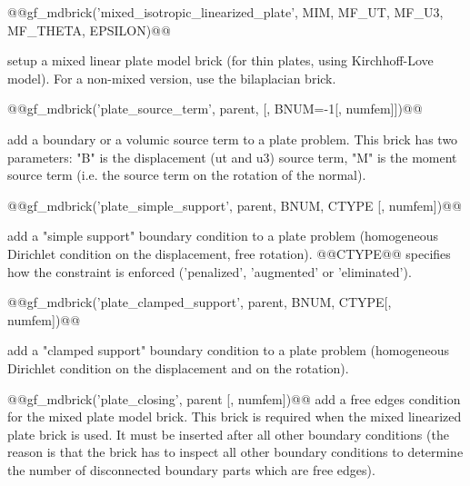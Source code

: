 \begin{cmddescription}
@@gf_mdbrick('mixed_isotropic_linearized_plate', MIM, MF_UT, MF_U3, MF_THETA, EPSILON)@@

setup a mixed linear plate model brick (for thin plates, using
Kirchhoff-Love model).  For a non-mixed version, use the bilaplacian
brick.

@@gf_mdbrick('plate_source_term', parent, [, BNUM=-1[, numfem]])@@

add a boundary or a volumic source term to a plate problem. This brick
has two parameters: "B" is the displacement (ut and u3) source term,
"M" is the moment source term (i.e. the source term on the rotation of
the normal).

@@gf_mdbrick('plate_simple_support', parent, BNUM, CTYPE [, numfem])@@

add a "simple support" boundary condition to a plate problem (homogeneous
Dirichlet condition on the displacement, free rotation). @@CTYPE@@ specifies how
the constraint is enforced ('penalized', 'augmented' or 'eliminated').


@@gf_mdbrick('plate_clamped_support', parent, BNUM, CTYPE[, numfem])@@

add a "clamped support" boundary condition to a plate problem
(homogeneous Dirichlet condition on the displacement and on the
rotation).

@@gf_mdbrick('plate_closing', parent [, numfem])@@
add a free edges condition for the mixed plate model brick.  This brick is
required when the mixed linearized plate brick is used. It must be inserted
after all other boundary conditions (the reason is that the brick has to
inspect all other boundary conditions to determine the number of disconnected
boundary parts which are free edges).

\end{cmddescription}
\newpage

